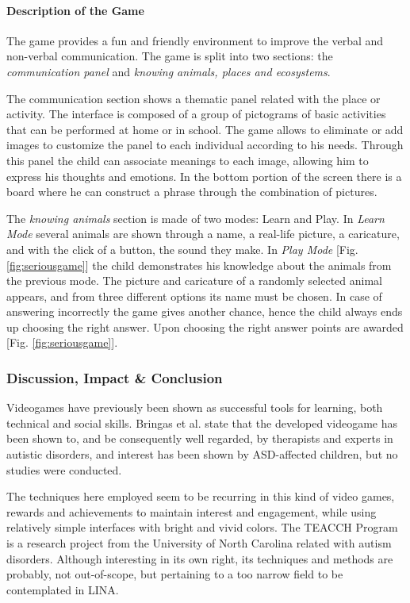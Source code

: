 \documentclass[runningheads]{llncs}
\begin{document}
\paragraph{Description of the Game} The game provides a fun and friendly environment to improve the verbal and non-verbal communication. The game is split into two sections: the \textit{communication panel} and \textit{knowing animals, places and ecosystems}.
\par The communication section shows a thematic panel related with the place or activity. The interface is composed of a group of pictograms of basic activities that can be performed at home or in school. The game allows to eliminate or add images to customize the panel to each individual according to his needs. Through this panel the child can associate meanings to each image, allowing him to express his thoughts and emotions. In the bottom portion of the screen there is a board where he can construct a phrase through the combination of pictures.
\par The \textit{knowing animals} section is made of two modes: Learn and Play. In \textit{Learn Mode} several animals are shown through a name, a real-life picture, a caricature, and with the click of a button, the sound they make. In \textit{Play Mode} [Fig. \ref{fig:seriousgame}] the child demonstrates his knowledge about the animals from the previous mode. The picture and caricature of a randomly selected animal appears, and from three different options its name must be chosen. In case of answering incorrectly the game gives another chance, hence the child always ends up choosing the right answer. Upon choosing the right answer points are awarded [Fig. \ref{fig:seriousgame}].



\subsubsection{Discussion, Impact \& Conclusion}
\par Videogames have previously been shown as successful tools for learning, both technical and social skills. Bringas et al. state that the developed videogame has been shown to, and be consequently well regarded, by therapists and experts in autistic disorders, and interest has been shown by ASD-affected children, but no studies were conducted.
\par The techniques here employed seem to be recurring in this kind of video games, rewards and achievements to maintain interest and engagement, while using relatively simple interfaces with bright and vivid colors. The TEACCH Program is a research project from the University of North Carolina related with autism disorders. Although interesting in its own right, its techniques and methods are probably, not out-of-scope, but pertaining to a too narrow field to be contemplated in LINA.
\end{document}
